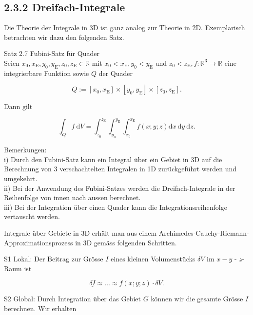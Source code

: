 \documentclass[10pt]{article}
\begin{document}
\subsection*{2.3.2 Dreifach-Integrale}
Die Theorie der Integrale in 3D ist ganz analog zur Theorie in 2D. Exemplarisch betrachten wir dazu den folgenden Satz.

Satz 2.7 Fubini-Satz für Quader\\
Seien $x_{0}, x_{\mathrm{E}}, y_{0}, y_{\mathrm{E}}, z_{0}, z_{\mathrm{E}} \in \mathbb{R}$ mit $x_{0}<x_{\mathrm{E}}, y_{0}<y_{\mathrm{E}}$ und $z_{0}<z_{\mathrm{E}}, f: \mathbb{R}^{3} \rightarrow \mathbb{R}$ eine integrierbare Funktion sowie $Q$ der Quader


\begin{equation*}
Q:=\left[x_{0}, x_{\mathrm{E}}\right] \times\left[y_{0}, y_{\mathrm{E}}\right] \times\left[z_{0}, z_{\mathrm{E}}\right] . \tag{2.90}
\end{equation*}


Dann gilt


\begin{equation*}
\int_{Q} f \mathrm{~d} V=\int_{z_{0}}^{z_{\mathrm{E}}} \int_{y_{0}}^{y_{\mathrm{E}}} \int_{x_{0}}^{x_{\mathrm{E}}} f(x ; y ; z) \mathrm{d} x \mathrm{~d} y \mathrm{~d} z . \tag{2.91}
\end{equation*}


Bemerkungen:\\
i) Durch den Fubini-Satz kann ein Integral über ein Gebiet in 3D auf die Berechnung von 3 verschachtelten Integralen in 1D zurückgeführt werden und umgekehrt.\\
ii) Bei der Anwendung des Fubini-Satzes werden die Dreifach-Integrale in der Reihenfolge von innen nach aussen berechnet.\\
iii) Bei der Integration über einen Quader kann die Integrationsreihenfolge vertauscht werden.

Integrale über Gebiete in 3D erhält man aus einem Archimedes-Cauchy-Riemann-Approximationsprozess in 3D gemäss folgenden Schritten.

S1 Lokal: Der Beitrag zur Grösse $I$ eines kleinen Volumenstücks $\delta V$ im $x-y$ - $z$-Raum ist


\begin{equation*}
\underline{\delta I} \approx \ldots \approx f(x ; y ; z) \cdot \delta V . \tag{2.92}
\end{equation*}


S2 Global: Durch Integration über das Gebiet $G$ können wir die gesamte Grösse $I$ berechnen. Wir erhalten
\end{document}
